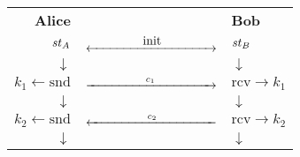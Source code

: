 \begin{tabular}{rC{4cm}l}
    \textbf{Alice} &  & \textbf{Bob} \\
    $\mathit{st}_A$ & $\xleftrightarrow{\makebox[3.5cm]{init}}$ & $\mathit{st}_B$ \\
    $\downarrow$ &  & $\downarrow$ \\ 
    $k_1\gets\mathrm{snd}$ & $\xrightarrow{\mathmakebox[3.5cm]{c_1}}$ & $\mathrm{rcv}\to k_1$ \\
    $\downarrow$ &  & $\downarrow$ \\  
    $k_2\gets\mathrm{snd}$ & $\xleftarrow{\mathmakebox[3.5cm]{c_2}}$ & $\mathrm{rcv}\to k_2$ \\
    $\downarrow$ &  & $\downarrow$ \\
\end{tabular}